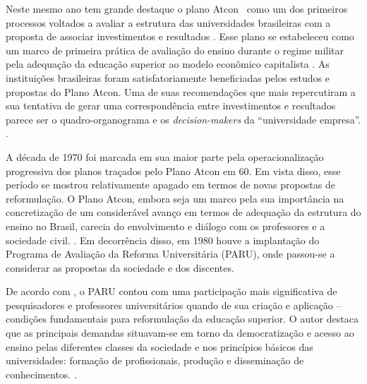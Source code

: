 	Neste mesmo ano tem grande destaque o plano Atcon\footnotemark~ como um dos primeiros processos voltados a avaliar a estrutura das universidades brasileiras com a proposta de associar investimentos e resultados \cite[p.~320]{Barbosa_Freire_Crisostomo_2011}. Esse plano se estabeleceu como um marco de primeira prática de avaliação do ensino durante o regime militar pela adequação da educação superior ao  modelo econômico capitalista \cite[389]{Zandavalli_2009}. As instituições brasileiras foram satisfatoriamente beneficiadas pelos estudos e propostas do Plano Atcon. Uma de suas recomendações que mais repercutiram a sua tentativa de gerar uma correspondência entre investimentos e resultados parece ser o quadro-organograma e os \textit{decision-makers} da ``universidade empresa''. .

	A década de 1970 foi marcada em sua maior parte pela operacionalização progressiva dos planos traçados pelo Plano Atcon em 60. Em vista disso, esse período se mostrou relativamente apagado em termos de novas propostas de reformulação. O Plano Atcon, embora seja um marco pela sua importância na concretização de um considerável avanço em termos de adequação da estrutura do ensino no Brasil, carecia do envolvimento e diálogo com os professores e a sociedade civil. . Em decorrência disso, em 1980 houve a implantação do Programa de Avaliação da Reforma Universitária (PARU), onde passou-se a considerar as propostas da sociedade e dos discentes.

	De acordo com , o PARU contou com uma participação mais significativa de pesquisadores e professores universitários quando de sua criação e aplicação -- condições fundamentais para reformulação da educação superior. O autor destaca que as principais demandas situavam-se em torno da democratização e acesso ao ensino pelas diferentes classes da sociedade e nos princípios básicos das universidades: formação de profissionais, produção e disseminação de conhecimentos. .

